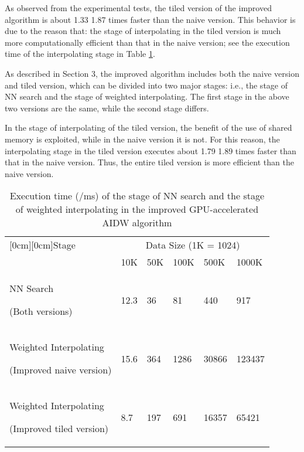 \documentclass[final,5p,times,twocolumn,authoryear]{elsarticle}
\begin{document}
			As observed from the experimental tests, the tiled version of the improved 
			algorithm is about 1.33  1.87 times faster than the naive version. 
			This behavior is due to the reason that: the stage of interpolating in the 
			tiled version is much more computationally efficient than that in the naive 
			version; see the execution time of the interpolating stage in Table \ref{tab2}.
			
			As described in Section 3, the improved algorithm includes both the naive 
			version and tiled version, which can be divided into two major stages: i.e., 
			the stage of NN search and the stage of weighted interpolating. The first 
			stage in the above two versions are the same, while the second stage 
			differs. 
			
			In the stage of interpolating of the tiled version, the benefit of the use 
			of shared memory is exploited, while in the naive version it is not. For 
			this reason, the interpolating stage in the tiled version executes about 
			1.79  1.89 times faster than that in the naive version. Thus, the 
			entire tiled version is more efficient than the naive version. 
			
			\begin{table}[htbp]
			\caption{Execution time (/ms) of the stage of NN search and the 
							stage of weighted interpolating in the improved GPU-accelerated AIDW 
							algorithm}
				\begin{center}
										\small
						\begin{tabular}{p{90pt}p{15pt}p{15pt}p{20pt}p{20pt}p{20pt}}
							\toprule
							\raisebox{-1.50ex}[0cm][0cm]{Stage}& 
							\multicolumn{5}{c}{Data Size (1K = 1024)}  \\
							\cline{2-6} 
							& 
						10K& 
						50K& 
						100K& 
						500K& 
						1000K \\
						\midrule
						NN Search \par (Both versions)& 
						12.3& 
						36& 
						81& 
						440& 
						917 \\
						Weighted Interpolating \par (Improved naive version)& 
						15.6& 
						364& 
						1286& 
						30866& 
						123437 \\
						Weighted Interpolating \par (Improved tiled version)& 
						8.7& 
						197& 
						691& 
						16357& 
						65421 \\
						\bottomrule
					\end{tabular}
					\label{tab2}
				\end{center}
			\end{table}
			
\end{document}
